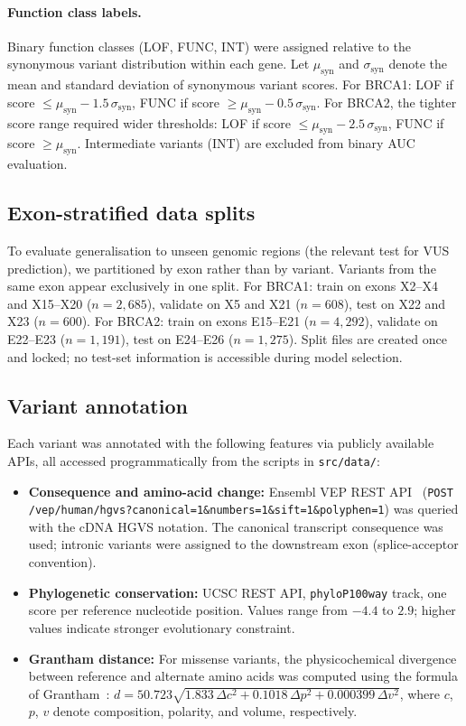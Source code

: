 \documentclass[12pt]{article}
\begin{document}
\paragraph{Function class labels.}
Binary function classes (LOF, FUNC, INT) were assigned relative to the synonymous
variant distribution within each gene.
Let $\mu_{\text{syn}}$ and $\sigma_{\text{syn}}$ denote the mean and standard deviation
of synonymous variant scores.
For BRCA1: LOF if score $\leq \mu_{\text{syn}} - 1.5\,\sigma_{\text{syn}}$, FUNC if
score $\geq \mu_{\text{syn}} - 0.5\,\sigma_{\text{syn}}$.
For BRCA2, the tighter score range required wider thresholds: LOF if
score $\leq \mu_{\text{syn}} - 2.5\,\sigma_{\text{syn}}$, FUNC if
score $\geq \mu_{\text{syn}}$.
Intermediate variants (INT) are excluded from binary AUC evaluation.

\subsection{Exon-stratified data splits}

To evaluate generalisation to unseen genomic regions (the relevant test for VUS
prediction), we partitioned by exon rather than by variant.
Variants from the same exon appear exclusively in one split.
For BRCA1: train on exons X2--X4 and X15--X20 ($n = 2{,}685$), validate on X5 and X21
($n = 608$), test on X22 and X23 ($n = 600$).
For BRCA2: train on exons E15--E21 ($n = 4{,}292$), validate on E22--E23
($n = 1{,}191$), test on E24--E26 ($n = 1{,}275$).
Split files are created once and locked; no test-set information is accessible during
model selection.

\subsection{Variant annotation}

Each variant was annotated with the following features via publicly available APIs,
all accessed programmatically from the scripts in \texttt{src/data/}:

\begin{itemize}
  \item \textbf{Consequence and amino-acid change:} Ensembl VEP REST
        API~\citep{vep} (\texttt{POST /vep/human/hgvs?canonical=1\&numbers=1\&sift=1\&polyphen=1})
        was queried with the cDNA HGVS notation.
        The canonical transcript consequence was used; intronic variants were assigned
        to the downstream exon (splice-acceptor convention).
  \item \textbf{Phylogenetic conservation:} UCSC REST API,
        \texttt{phyloP100way} track, one score per reference nucleotide position.
        Values range from $-4.4$ to $2.9$; higher values indicate stronger evolutionary
        constraint.
  \item \textbf{Grantham distance:} For missense variants, the physicochemical
        divergence between reference and alternate amino acids was computed using
        the formula of Grantham~\citep{grantham1974}:
        $d = 50.723\sqrt{1.833\,\Delta c^2 + 0.1018\,\Delta p^2 + 0.000399\,\Delta v^2}$,
        where $c$, $p$, $v$ denote composition, polarity, and volume, respectively.
\end{itemize}
\end{document}
